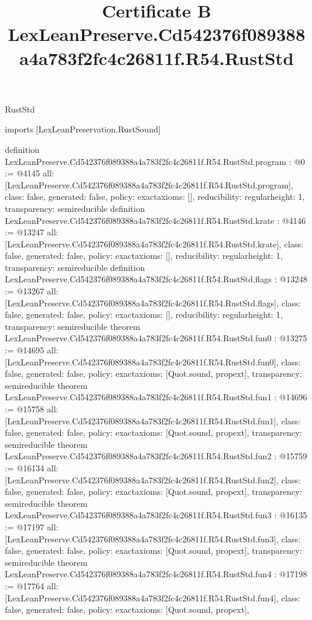 \begin{lexlean}{RustStd}
\title{Certificate B LexLeanPreserve.Cd542376f089388a4a783f2fc4c26811f.R54.RustStd}
\begin{coremodule}
imports [LexLeanPreservation.RustSound]

definition LexLeanPreserve.Cd542376f089388a4a783f2fc4c26811f.R54.RustStd.program : @0 := @4145 {
  all: [LexLeanPreserve.Cd542376f089388a4a783f2fc4c26811f.R54.RustStd.program],
  class: false,
  generated: false,
  policy: exact{axioms: []},
  reducibility: regular{height: 1},
  transparency: semireducible
}
definition LexLeanPreserve.Cd542376f089388a4a783f2fc4c26811f.R54.RustStd.krate : @4146 := @13247 {
  all: [LexLeanPreserve.Cd542376f089388a4a783f2fc4c26811f.R54.RustStd.krate],
  class: false,
  generated: false,
  policy: exact{axioms: []},
  reducibility: regular{height: 1},
  transparency: semireducible
}
definition LexLeanPreserve.Cd542376f089388a4a783f2fc4c26811f.R54.RustStd.flags : @13248 := @13267 {
  all: [LexLeanPreserve.Cd542376f089388a4a783f2fc4c26811f.R54.RustStd.flags],
  class: false,
  generated: false,
  policy: exact{axioms: []},
  reducibility: regular{height: 1},
  transparency: semireducible
}
theorem LexLeanPreserve.Cd542376f089388a4a783f2fc4c26811f.R54.RustStd.fun0 : @13275 := @14695 {
  all: [LexLeanPreserve.Cd542376f089388a4a783f2fc4c26811f.R54.RustStd.fun0],
  class: false,
  generated: false,
  policy: exact{axioms: [Quot.sound, propext]},
  transparency: semireducible
}
theorem LexLeanPreserve.Cd542376f089388a4a783f2fc4c26811f.R54.RustStd.fun1 : @14696 := @15758 {
  all: [LexLeanPreserve.Cd542376f089388a4a783f2fc4c26811f.R54.RustStd.fun1],
  class: false,
  generated: false,
  policy: exact{axioms: [Quot.sound, propext]},
  transparency: semireducible
}
theorem LexLeanPreserve.Cd542376f089388a4a783f2fc4c26811f.R54.RustStd.fun2 : @15759 := @16134 {
  all: [LexLeanPreserve.Cd542376f089388a4a783f2fc4c26811f.R54.RustStd.fun2],
  class: false,
  generated: false,
  policy: exact{axioms: [Quot.sound, propext]},
  transparency: semireducible
}
theorem LexLeanPreserve.Cd542376f089388a4a783f2fc4c26811f.R54.RustStd.fun3 : @16135 := @17197 {
  all: [LexLeanPreserve.Cd542376f089388a4a783f2fc4c26811f.R54.RustStd.fun3],
  class: false,
  generated: false,
  policy: exact{axioms: [Quot.sound, propext]},
  transparency: semireducible
}
theorem LexLeanPreserve.Cd542376f089388a4a783f2fc4c26811f.R54.RustStd.fun4 : @17198 := @17764 {
  all: [LexLeanPreserve.Cd542376f089388a4a783f2fc4c26811f.R54.RustStd.fun4],
  class: false,
  generated: false,
  policy: exact{axioms: [Quot.sound, propext]},
}
\end{coremodule}
\end{lexlean}
